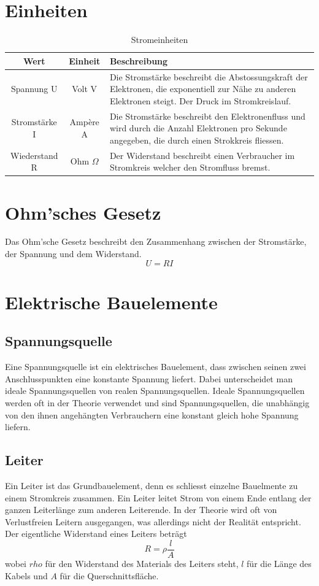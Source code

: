 \documentclass{article}
\author{Philipp Kiss}
\begin{document}
\tableofcontents
\newpage

\section{Einheiten}
\begin{table}[h!]
		\begin{center}
				\caption{Stromeinheiten}
				\label{tab:Stromeinheiten}
				\begin{tabular}{|c|c|p{7cm}|}
						\hline
						\textbf{Wert} & \textbf{Einheit} & \textbf{Beschreibung} \\
						\hline
						Spannung U & Volt V & Die Stromstärke beschreibt die Abstossungskraft der Elektronen, die exponentiell zur Nähe zu anderen Elektronen steigt. Der Druck im Stromkreislauf.\\
						\hline
						Stromstärke I & Ampère A& Die Stromstärke beschreibt den Elektronenfluss und wird durch die Anzahl Elektronen pro Sekunde angegeben, die durch einen Strokkreis fliessen.\\
						\hline
						Wiederstand R & Ohm \(\Omega\) & Der Widerstand beschreibt einen Verbraucher im Stromkreis welcher den Stromfluss bremst.\\
						\hline
				\end{tabular}
		\end{center}
\end{table}
\section{Ohm'sches Gesetz}
Das Ohm'sche Gesetz beschreibt den Zusammenhang zwischen der Stromstärke, der Spannung und dem Widerstand. \[
U=RI
\]
\section{Elektrische Bauelemente}
\subsection{Spannungsquelle}
Eine Spannungsquelle ist ein elektrisches Bauelement, dass zwischen seinen zwei Anschlusspunkten eine konstante Spannung liefert. Dabei unterscheidet man ideale Spannungsquellen von realen Spannungsquellen. Ideale Spannungsquellen werden oft in der Theorie verwendet und sind Spannungsquellen, die unabhängig von den ihnen angehängten Verbrauchern eine konstant gleich hohe Spannung liefern.

\subsection{Leiter}
Ein Leiter ist das Grundbauelement, denn es schliesst einzelne Bauelmente zu einem Stromkreis zusammen. Ein Leiter leitet Strom von einem Ende entlang der ganzen Leiterlänge zum anderen Leiterende. In der Theorie wird oft von Verlustfreien Leitern ausgegangen, was allerdings nicht der Realität entspricht. Der eigentliche Widerstand eines Leiters beträgt \[
R = \rho \frac{l}{A} 
\] wobei \(rho\) für den Widerstand des Materials des Leiters steht, \(l\) für die Länge des Kabels und \(A\) für die Querschnittsfläche.
\end{document}
